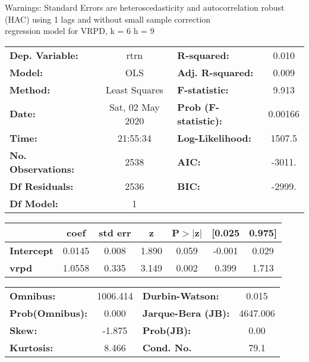 Warnings: \newline
 [1] Standard Errors are heteroscedasticity and autocorrelation robust (HAC) using 1 lags and without small sample correction\\ 

regression model for VRPD, k = 6 h = 9\begin{center}
\begin{tabular}{lclc}
\toprule
\textbf{Dep. Variable:}    &       rtrn       & \textbf{  R-squared:         } &     0.010   \\
\textbf{Model:}            &       OLS        & \textbf{  Adj. R-squared:    } &     0.009   \\
\textbf{Method:}           &  Least Squares   & \textbf{  F-statistic:       } &     9.913   \\
\textbf{Date:}             & Sat, 02 May 2020 & \textbf{  Prob (F-statistic):} &  0.00166    \\
\textbf{Time:}             &     21:55:34     & \textbf{  Log-Likelihood:    } &    1507.5   \\
\textbf{No. Observations:} &        2538      & \textbf{  AIC:               } &    -3011.   \\
\textbf{Df Residuals:}     &        2536      & \textbf{  BIC:               } &    -2999.   \\
\textbf{Df Model:}         &           1      & \textbf{                     } &             \\
\bottomrule
\end{tabular}
\begin{tabular}{lcccccc}
                   & \textbf{coef} & \textbf{std err} & \textbf{z} & \textbf{P$> |$z$|$} & \textbf{[0.025} & \textbf{0.975]}  \\
\midrule
\textbf{Intercept} &       0.0145  &        0.008     &     1.890  &         0.059        &       -0.001    &        0.029     \\
\textbf{vrpd}      &       1.0558  &        0.335     &     3.149  &         0.002        &        0.399    &        1.713     \\
\bottomrule
\end{tabular}
\begin{tabular}{lclc}
\textbf{Omnibus:}       & 1006.414 & \textbf{  Durbin-Watson:     } &    0.015  \\
\textbf{Prob(Omnibus):} &   0.000  & \textbf{  Jarque-Bera (JB):  } & 4647.006  \\
\textbf{Skew:}          &  -1.875  & \textbf{  Prob(JB):          } &     0.00  \\
\textbf{Kurtosis:}      &   8.466  & \textbf{  Cond. No.          } &     79.1  \\
\bottomrule
\end{tabular}
\end{center}

